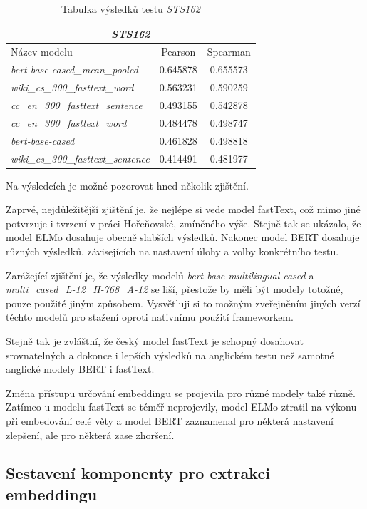 \documentclass[thesis=M,czech]{FITthesis}[2019/12/23]
\begin{document}
\begin{table}[h!]
\centering
\begin{tabular}{ |l|c|c| }
 \hline
 \multicolumn{3}{|c|}{\textit{STS162}} \\\hline
 \hline
  Název modelu & Pearson & Spearman \\\hline
\textit{bert-base-cased\_mean\_pooled} & 0.645878 & 0.655573\\
\textit{wiki\_cs\_300\_fasttext\_word} & 0.563231 & 0.590259\\
\textit{cc\_en\_300\_fasttext\_sentence} & 0.493155 & 0.542878\\
\textit{cc\_en\_300\_fasttext\_word} & 0.484478 & 0.498747\\
\textit{bert-base-cased} & 0.461828 & 0.498818\\
\textit{wiki\_cs\_300\_fasttext\_sentence} & 0.414491 & 0.481977\\\hline
\end{tabular}
\caption{Tabulka výsledků testu \textit{STS162}}
\label{table:STS162}
\end{table}

Na výsledcích je možné pozorovat hned několik zjištění.

Zaprvé, nejdůležitější zjištění je, že nejlépe si vede model fastText, což mimo jiné potvrzuje i tvrzení v práci Hořeňovské\cite{horenovska2019}, zmíněného výše. Stejně tak se ukázalo, že model ELMo dosahuje obecně slabších výsledků. Nakonec model BERT dosahuje různých výsledků, závisejících na nastavení úlohy a volby konkrétního testu.

Zarážející zjištění je, že výsledky modelů \textit{bert-base-multilingual-cased} a \textit{multi\_cased\_L-12\_H-768\_A-12} se liší, přestože by měli být modely totožné, pouze použité jiným způsobem. Vysvětluji si to možným zveřejněním jiných verzí těchto modelů pro stažení oproti nativnímu použití frameworkem.

Stejně tak je zvláštní, že český model fastText je schopný dosahovat srovnatelných a dokonce i lepších výsledků na anglickém testu než samotné anglické modely BERT i fastText.

Změna přístupu určování embeddingu se projevila pro různé modely také různě. Zatímco u modelu fastText se téměř neprojevily, model ELMo ztratil na výkonu při embedování celé věty a model BERT zaznamenal pro některá nastavení zlepšení, ale pro některá zase zhoršení.


\subsection{Sestavení komponenty pro extrakci embeddingu}
\label{sec:component_embedding}
\end{document}
